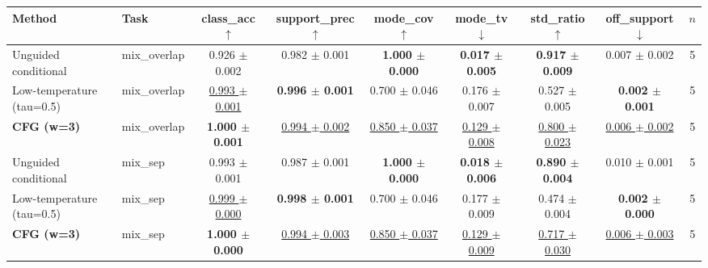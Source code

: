 \begin{tabular}{llccccccc}
\toprule
Method & Task & class\_acc $\uparrow$ & support\_prec $\uparrow$ & mode\_cov $\uparrow$ & mode\_tv $\downarrow$ & std\_ratio $\uparrow$ & off\_support $\downarrow$ & $n$ \\
\midrule
Unguided conditional & mix\_overlap & 0.926 $\pm$ 0.002 & 0.982 $\pm$ 0.001 & \textbf{1.000 $\pm$ 0.000} & \textbf{0.017 $\pm$ 0.005} & \textbf{0.917 $\pm$ 0.009} & 0.007 $\pm$ 0.002 & 5 \\
Low-temperature (tau=0.5) & mix\_overlap & \underline{0.993 $\pm$ 0.001} & \textbf{0.996 $\pm$ 0.001} & 0.700 $\pm$ 0.046 & 0.176 $\pm$ 0.007 & 0.527 $\pm$ 0.005 & \textbf{0.002 $\pm$ 0.001} & 5 \\
\textbf{CFG (w=3)} & mix\_overlap & \textbf{1.000 $\pm$ 0.001} & \underline{0.994 $\pm$ 0.002} & \underline{0.850 $\pm$ 0.037} & \underline{0.129 $\pm$ 0.008} & \underline{0.800 $\pm$ 0.023} & \underline{0.006 $\pm$ 0.002} & 5 \\
\midrule
Unguided conditional & mix\_sep & 0.993 $\pm$ 0.001 & 0.987 $\pm$ 0.001 & \textbf{1.000 $\pm$ 0.000} & \textbf{0.018 $\pm$ 0.006} & \textbf{0.890 $\pm$ 0.004} & 0.010 $\pm$ 0.001 & 5 \\
Low-temperature (tau=0.5) & mix\_sep & \underline{0.999 $\pm$ 0.000} & \textbf{0.998 $\pm$ 0.001} & 0.700 $\pm$ 0.046 & 0.177 $\pm$ 0.009 & 0.474 $\pm$ 0.004 & \textbf{0.002 $\pm$ 0.000} & 5 \\
\textbf{CFG (w=3)} & mix\_sep & \textbf{1.000 $\pm$ 0.000} & \underline{0.994 $\pm$ 0.003} & \underline{0.850 $\pm$ 0.037} & \underline{0.129 $\pm$ 0.009} & \underline{0.717 $\pm$ 0.030} & \underline{0.006 $\pm$ 0.003} & 5 \\
\bottomrule
\end{tabular}
